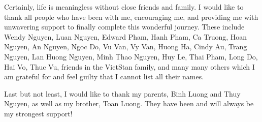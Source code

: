 Certainly, life is meaningless without close friends and family. I would like to
thank all people who have been with me, encouraging me, and providing me with
unwavering support to finally complete this wonderful journey. These include Wendy Nguyen,
Luan Nguyen, Edward Pham, Hanh Pham, Ca Truong, Hoan Nguyen, An Nguyen, Ngoc Do,
Vu Van, Vy Van, Huong Ha, Cindy Au, Trang Nguyen, Lan Huong Nguyen, Minh Thao Nguyen, 
Huy Le, Thai Pham, Long Do, Hai Vo, Thuc Vu, friends in the VietStan family, and
many many others which I am grateful for and feel guilty that I cannot list all their names.

Last but not least, I would like to
thank my parents, Binh Luong and Thuy Nguyen, as well as my brother, Toan
Luong. They have been and will always be my strongest support!
